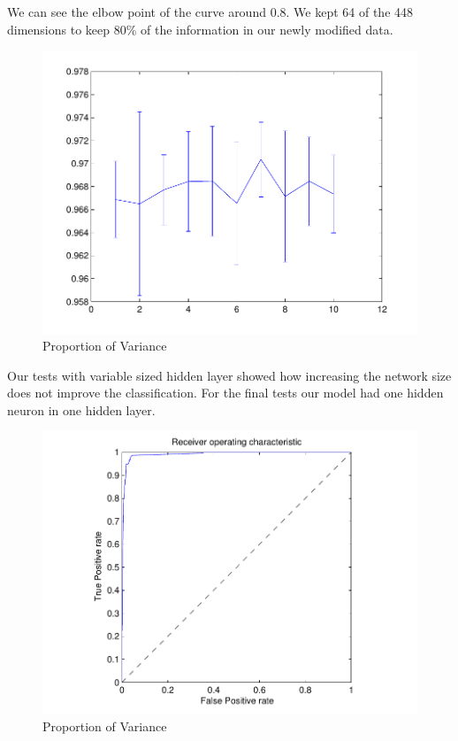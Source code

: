 We can see the elbow point of the curve around 0.8. We kept 64 of the 448 dimensions to keep 80\% of the information in our newly modified data.

\begin{figure}[h]
  \centering
  \includegraphics{hidden_neurons_are_useless}
  \caption{Proportion of Variance}
\end{figure}


Our tests with variable sized hidden layer showed how increasing the network size does not improve the classification. For the final tests our model had one hidden neuron in one hidden layer.

\begin{figure}[h]
  \centering
  \includegraphics{roc}
  \caption{Proportion of Variance}
\end{figure}

